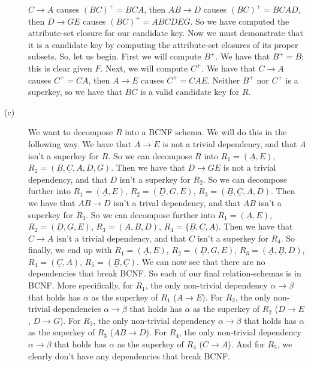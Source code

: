 \documentclass{article}
\begin{document}
\begin{description}
        $C \rightarrow A$ causes $(BC)^+ = BCA$, then $AB \rightarrow D$ causes
        $(BC)^+ = BCAD$, then $D \rightarrow GE$ causes $(BC)^+ = ABCDEG$.
        So we have computed the attribute-set closure for our candidate key.
        Now we must demonstrate that it is a candidate key by computing the
        attribute-set closures of its proper subsets. So, let us begin.
        First we will compute $B^+$. We have that $B^+ = B$; this is clear
        given $F$. Next, we will compute $C^+$. We have that $C \rightarrow A$
        causes $C^+ = CA$, then $A \rightarrow E$ causes $C^+ = CAE$.
        Neither $B^+$ nor $C^+$ is a superkey, so we have that $BC$ is a valid
        candidate key for $R$.
    \item[(c)] We want to decompose $R$ into a BCNF schema. We will do this
        in the following way. We have that $A \rightarrow E$ is not a trivial
        dependency, and that $A$ isn't a superkey for $R$. So we can decompose
        $R$ into $R_1 = (\underline{A}, E)$, $R_2 = (\underline{B},
        \underline{C}, A, D, G)$. Then we have that $D \rightarrow GE$ is not
        a trivial dependency, and that $D$ isn't a superkey for $R_2$. So
        we can decompose further into $R_1 = (\underline{A}, E)$,
        $R_2 = (\underline{D}, G, E)$, $R_3 = (\underline{B}, \underline{C},
        A, D)$. Then we have that $AB \rightarrow D$ isn't a trival dependency,
        and that $AB$ isn't a superkey for $R_3$. So we can decompose further
        into $R_1 = (\underline{A}, E)$, $R_2 = (\underline{D}, G, E)$,
        $R_3 = (\underline{A}, \underline{B}, D)$, $R_4 = \{\underline{B},
        \underline{C}, A)$. Then we have that $C \rightarrow A$ isn't a trivial
        dependency, and that $C$ isn't a superkey for $R_4$. So finally, we
        end up with $R_1 = (\underline{A}, E)$, $R_2 = (\underline{D}, G, E)$,
        $R_3 = (\underline{A}, \underline{B}, D)$, $R_4 = (\underline{C}, A)$,
        $R_5 = (\underline{B}, \underline{C})$. We can now see that there are
        no dependencies that break BCNF. So each of our final relation-schemas
        is in BCNF. More specifically, for $R_1$, the only non-trivial
        dependency $\alpha \rightarrow \beta$ that holds has $\alpha$ as
        the superkey of $R_1$ ($A \rightarrow E$).
        For $R_2$, the only non-trivial
        dependencies $\alpha \rightarrow \beta$ that holds has $\alpha$ as
        the superkey of $R_2$ ($D \rightarrow E$, $D \rightarrow G$).
        For $R_3$, the only non-trivial
        dependency $\alpha \rightarrow \beta$ that holds has $\alpha$ as
        the superkey of $R_3$ ($AB \rightarrow D$).
        For $R_4$, the only non-trivial
        dependency $\alpha \rightarrow \beta$ that holds has $\alpha$ as
        the superkey of $R_4$ ($C \rightarrow A$). And for $R_5$, we
        clearly don't have any dependencies that break BCNF.


\end{description}
\end{document}
